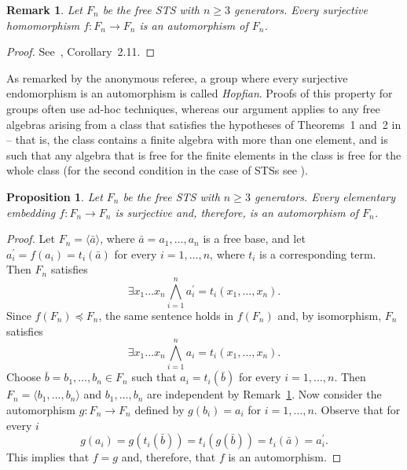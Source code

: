 \documentclass[a4paper, 11pt]{article}
\theoremstyle{note}
\newtheorem{rmk}[thm]{Remark}
\newtheorem{prop}[thm]{Proposition}
\begin{document}
 
	\begin{rmk}\label{April_11_2024_4} Let $F_n$ be the free STS with $n\geq 3$ generators. Every surjective homomorphism $f:F_n\rightarrow F_n$  is an automorphism of $F_n$.
	\end{rmk}
	\begin{proof}  See~\cite{barcas2}, Corollary~2.11.
	\end{proof}
As remarked by the anonymous referee, a group where every surjective endomorphism is an automorphism is called \textit{Hopfian}. Proofs of this property for groups often use ad-hoc techniques, whereas our argument applies to any free algebras arising from a class that satisfies the hypotheses of Theorems~1 and~2 in \cite{jontarski} -- that is, the class contains a finite algebra with more than one element, and is such that any algebra that is free for the finite elements in the class is free for the whole class (for the second condition in the case of STSs see \cite[Lemma~2.6]{barcas2}).
	\begin{prop}\label{April_11_2024_5} Let $F_n$ be the free STS with $n\geq 3$ generators. Every elementary embedding $f:F_n\rightarrow F_n$ is surjective and, therefore, is an automorphism of $F_n$.
	\end{prop}
	\begin{proof} Let  $F_n=\langle \bar{a}\rangle$, where $\bar{a}=a_1,\ldots,a_n$ is a free base,  and let $a_i^\prime =f(a_i) = t_i(\bar{a})$  for every   $i=1,\ldots,n$, where $t_i$ is a corresponding term. Then  $F_n$ satisfies
		$$\exists x_1\ldots x_n  \bigwedge_{i=1}^n  a_i^\prime = t_i(x_1,\ldots,x_n).$$
		Since $f(F_n)\preceq F_n$, the same sentence holds in $f(F_n)$ and, by isomorphism,  $F_n$ satisfies
		$$\exists x_1\ldots x_n  \bigwedge_{i=1}^n  a_i= t_i(x_1,\ldots,x_n).$$
		Choose $\bar{b}= b_1,\ldots,b_n\in F_n$  such that   $a_i= t_i(\bar{b})$  for every $i=1,\ldots,n$. Then  $F_n=\langle b_1,\ldots,b_n\rangle$  and $b_1,\ldots,b_n$ are independent by Remark~\ref{April_11_2024_4}. Now consider the automorphism $g:F_n\rightarrow F_n$  defined by  $g(b_i)=a_i$  for  $i=1,\ldots,n$. Observe that  for every $i$
		$$g(a_i)= g(t_i(\bar{b}))= t_i(g(\bar{b}))=t_i(\bar{a})= a_i^\prime.$$
		This implies that $f=g$ and, therefore, that $f$ is an automorphism.
	\end{proof}
	
	
	
\end{document}
